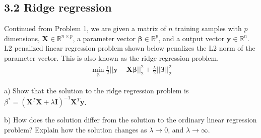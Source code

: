 \subsection*{3.2 Ridge regression}
Continued from Problem 1, we are given a matrix of $n$ training samples with $p$ dimensions, $\mathbf{X}\in \mathbb{R}^{n \times p}$, a parameter vector $\mathbf{\beta}\in\mathbb{R}^{p}$, and a output vector $\mathbf{y}\in\mathbb{R}^{n}$.
L2 penalized linear regression problem shown below penalizes the L2 norm of the parameter vector. This is also known as the ridge regression problem.
\begin{align*} 
    \min_{\mathbf{\beta}} \frac{1}{2}||\mathbf{y} - \mathbf{X}\mathbf{\beta}||_2^2 + \frac{\lambda}{2} ||\mathbf{\beta}||_2^2
\end{align*}

a) Show that the solution to the ridge regression problem is $\beta^*= (\mathbf{X}^T\mathbf{X} +\lambda \mathbf{I})^{-1}\mathbf{X}^T\mathbf{y}$.

b) How does the solution differ from the solution to the ordinary linear regression problem? Explain how the solution changes as $\lambda \rightarrow 0$, and $\lambda \rightarrow \infty$.

\newpage

